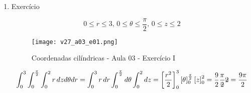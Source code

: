 \begin{enumerate}
	\item Exercício
	
	\begin{equation*}
		0 \leq r \leq 3,\, 0 \leq \theta \leq \dfrac{\pi}{2},\, 0 \leq z \leq 2
	\end{equation*}
	
	\begin{figure}[htb]
		\caption{Coordenadas cilíndricas - Aula 03 - Exercício I}
		\label{v27_a03_e01}
		\centering
		\texttt{[image: v27\_a03\_e01.png]}		
	\end{figure}
	
	\begin{gather*}
		\int_0^3 \int_0^{\frac{\pi}{2}} \int_0^2 r\, dz d\theta dr = \int_0^3 r\, dr \int_0^{\frac{\pi}{2}} d\theta \int_0^2 dz = \left[\dfrac{r^2}{2}\right]_0^3 \left[\theta\right]_0^{\frac{\pi}{2}} \left[z\right]_0^2 = \dfrac{9}{2}\dfrac{\pi}{\overstrike{2}}\overstrike{2} = \dfrac{9\pi}{2}
	\end{gather*}
\end{enumerate}